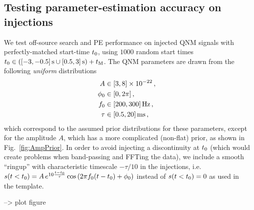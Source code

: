 \documentclass[aps,prd,onecolumn,notitlepage,nofootinbib,superscriptaddress,altaffilletter,floatfix]{revtex4-1}
\begin{document}
\newpage

\subsection{Testing parameter-estimation accuracy on injections}
\label{sec:test-param-estim}

We test off-source search and PE performance on injected QNM signals with perfectly-matched start-time $t_0$, using $1000$ random start times
$t_0 \in \left( {[-3,-0.5]}\,\mathrm{s} \cup {[0.5,3]}\,\mathrm{s}\right) + t_{\mathrm{M}}$. The QNM parameters are drawn from the following \emph{uniform} distributions
\begin{align}
  \label{eq:24}
  A      & \in {[3,8]}\times10^{-22}\,,\\
  \phi_0 &\in {[0,2\pi]}\,,\\
  f_0    &\in {[200,300]}\,\mathrm{Hz}\,,\\
  \tau   &\in {[0.5,20]}\,\mathrm{ms}\,,
\end{align}
which correspond to the assumed prior distributions for these parameters, except for the amplitude $A$, which has a more complicated (non-flat) prior,
as shown in Fig.~\ref{fig:AmpPrior}.
In order to avoid injecting a discontinuity at $t_0$ (which would create problems when band-passing and FFTing the data), we include a smooth
``ringup'' with characteristic timescale $-\tau/10$ in the injections, i.e.\ $s(t<t_0) = A\,e^{10\frac{t-t_0}{\tau}}\cos\left(2\pi f_0
  (t-t_0) + \phi_0\right)$ instead of $s(t<t_0)=0$ as used in the template.

--> plot figure
\end{document}
